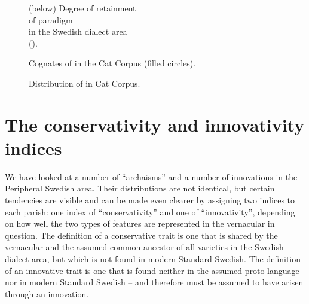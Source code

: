 \begin{figure}[h]
\caption{(below) Degree of retainment\\
of paradigm\\
in the Swedish dialect area\\
(\citet{Markey1969}).}
\label{map:6:32a}
\end{figure}

\begin{figure}[h]
\caption{}
\label{map:6:32a}
\end{figure}

\begin{figure}[h]
\caption{Cognates of  in the Cat Corpus (filled circles).}
\label{map:6:32b}
\end{figure}

\begin{figure}[h]
\caption{Distribution of  in Cat Corpus.}
\label{map:6:33}
\end{figure}
   
\section{The conservativity and innovativity indices}

We have looked at a number of “archaisms” and a number of innovations in the Peripheral Swedish area. Their distributions are not identical, but certain tendencies are visible and can be made even clearer by assigning two indices to each parish: one index of “conservativity” and one of “innovativity”, depending on how well the two types of features are represented in the vernacular in question. The definition of a conservative trait is one that is shared by the vernacular and the assumed common ancestor of all varieties in the Swedish dialect area, but which is not found in modern Standard Swedish. The definition of an innovative trait is one that is found neither in the assumed proto-language nor in modern Standard Swedish – and therefore must be assumed to have arisen through an innovation. 


